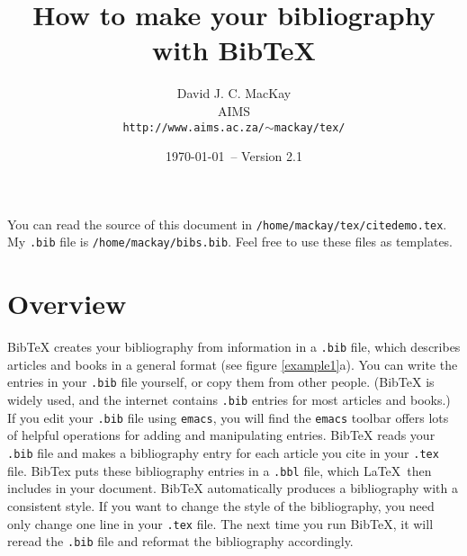 \documentclass[11pt]{article}
\begin{document}
\title{How to make your bibliography with BibTeX}
\author{David J. C. MacKay\\
 AIMS\\
 {\tt http://www.aims.ac.za/$\sim$mackay/tex/}
}
\date{\today\ -- Version 2.1}
\maketitle
 You {{can}} read the source of this document in 
 {\tt{/home/mackay/tex/citedemo.tex}}.
 My {\tt{.bib}} file is
 {\tt{/home/mackay/bibs.bib}}.
 Feel free to use these files as templates.

\section{Overview}
 BibTeX creates your bibliography from information 
 in  a {\tt{.bib}} file, which describes articles 
 and books in a general format (see figure \ref{example1}a).
 You can write the entries 
 in your {\tt{.bib}} file yourself, or copy them from 
 other people.  (BibTeX is widely used, and the
 internet contains
  {\tt{.bib}} entries for most articles and books.)
 If you edit your {\tt{.bib}} file using {\tt{emacs}}, 
 you will find the {\tt{emacs}} toolbar offers lots of helpful 
 operations for adding and manipulating entries.  
 BibTeX reads your 
  {\tt{.bib}} file  and makes a bibliography  entry
 for each 
 article you cite in your {\tt{.tex}} file. 
 BibTex puts these  bibliography  entries in  a {\tt{.bbl}}
 file, which \LaTeX\ then includes in your 
 document.  
 BibTeX automatically  produces a bibliography 
 with a consistent style.
 If you want to change the style of the bibliography, 
 you need only change one line in your {\tt{.tex}} file. The 
 next time you run BibTeX, it  will reread  the  {\tt{.bib}} file
 and reformat the bibliography accordingly. 
 
\end{document}
